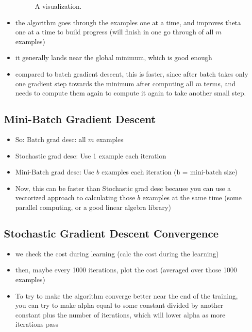 \documentclass[]{article}
\begin{document}
\begin{itemize}
\begin{figure}[ht!]
				\caption{A visualization.}
			\end{figure}
			\item the algorithm goes through the examples one at a time, and improves theta one at a time to build progress (will finish in one go through of all $m$ examples)
			\item it generally lands near the global minimum, which is good enough
			\item compared to batch gradient descent, this is faster, since after batch takes only one gradient step towards the minimum after computing all $m$ terms, and needs to compute them again to compute it again to take another small step.
		\end{itemize}
	
	\subsection{Mini-Batch Gradient Descent}
		\begin{itemize}
			\item So: Batch grad desc: all $m$ examples
			\item Stochastic grad desc: Use 1 example each iteration
			\item Mini-Batch grad desc: Use $b$ examples each iteration (b = mini-batch size)
			\item Now, this can be faster than Stochastic grad desc because you can use a vectorized approach to calculating those $b$ examples at the same time (some parallel computing, or a good linear algebra library)
		\end{itemize}
		
	\subsection{Stochastic Gradient Descent Convergence}
		\begin{itemize}
			\item we check the cost during learning (calc the cost during the learning)
			\item then, maybe every 1000 iterations, plot the cost (averaged over those 1000 examples)
			\item To try to make the algorithm converge better near the end of the training, you can try to make alpha equal to some constant divided by another constant plus the number of iterations, which will lower alpha as more iterations pass
			
		\end{itemize}
		
\end{document}

